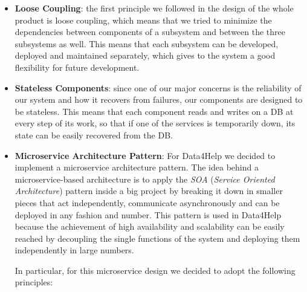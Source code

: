 \begin{itemize}
	\item \textbf{Loose Coupling}: the first principle we followed in the design of the whole product is loose coupling, which means that we tried to minimize the dependencies between components of a subsystem and between the three subsystems as well. This means that each subsystem can be developed, deployed and maintained separately, which gives to the system a good flexibility for future development.
	\item \textbf{Stateless Components}: since one of our major concerns is the reliability of our system and how it recovers from failures, our components are designed to be stateless. This means that each component reads and writes on a DB at every step of its work, so that if one of the services is temporarily down, its state can be easily recovered from the DB.
	\item \textbf{Microservice Architecture Pattern}: For Data4Help we decided to implement a microservice architecture pattern. The idea behind a microservice-based architecture is to apply the \textit{SOA} (\textit{Service Oriented Architecture}) pattern  inside a big project by breaking it down in smaller pieces that act independently, communicate asynchronously and can be deployed in any fashion and number. This pattern is used in Data4Help because the achievement of high availability and scalability can be easily reached by decoupling the single functions of the system and deploying them independently in large numbers.
	
	In particular, for this microservice design we decided to adopt the following principles:
	

\end{itemize}
